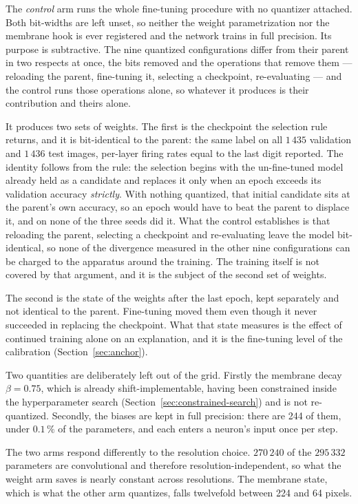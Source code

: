 The \emph{control} arm runs the whole fine-tuning procedure with no quantizer
attached. Both bit-widths are left unset, so neither the weight parametrization
nor the membrane hook is ever registered and the network trains in full
precision. Its purpose is subtractive. The nine quantized configurations differ
from their parent in two respects at once, the bits removed and the operations
that remove them --- reloading the parent, fine-tuning it, selecting a
checkpoint, re-evaluating --- and the control runs those operations alone, so
whatever it produces is their contribution and theirs alone.

It produces two sets of weights. The first is the checkpoint the selection
rule returns, and it is bit-identical
to the parent: the same label on all $1\,435$ validation and $1\,436$ test
images, per-layer firing rates equal to the last digit reported. The identity
follows from the rule: the selection begins with the
un-fine-tuned model already held as a candidate and replaces it only when an
epoch exceeds its validation accuracy \emph{strictly}. With nothing quantized, that initial candidate sits at
the parent's own accuracy, so an epoch would have to beat the parent to displace
it, and on none of the three seeds did it. What the control establishes 
is that reloading the parent, selecting a checkpoint and re-evaluating
leave the model bit-identical, so none of the divergence measured in the other
nine configurations can be charged to the apparatus around the training. The
training itself is not covered by that argument, and it is the subject of the
second set of weights.

The second is the state of the weights after the last epoch, kept separately and
not identical to the parent. Fine-tuning moved them even though it never
succeeded in replacing the checkpoint. What that state measures is the effect of
continued training alone on an explanation, and it is the fine-tuning level of
the calibration (Section~\ref{sec:anchor}).

Two quantities are deliberately left out of the grid. Firstly the membrane decay
$\beta = 0.75$, which is already shift-implementable, having been constrained inside the
hyperparameter search (Section~\ref{sec:constrained-search}) and is not
re-quantized. Secondly, the biases are kept
in full precision: there are 244 of them, under $0.1\,\%$ of the parameters,
and each enters a neuron's input once per step.

The two arms respond differently to the resolution choice. $270\,240$ of the
$295\,332$ parameters are convolutional and therefore resolution-independent, so
what the weight arm saves is nearly constant across resolutions. The membrane
state, which is what the other arm quantizes, falls twelvefold between 224 and
64 pixels.

